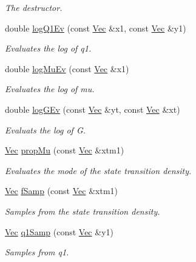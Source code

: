 \begin{DoxyCompactItemize}
\begin{DoxyCompactList}\small\item\em The destructor. \end{DoxyCompactList}\item 
double \hyperlink{classNAr1APFFilter_a0839d99fe62312b8a2c5c781b879fa79}{log\+Q1\+Ev} (const \hyperlink{pmfs_8h_a4c7df05c6f5e8a0d15ae14bcdbc07152}{Vec} \&x1, const \hyperlink{pmfs_8h_a4c7df05c6f5e8a0d15ae14bcdbc07152}{Vec} \&y1)
\begin{DoxyCompactList}\small\item\em Evaluates the log of q1. \end{DoxyCompactList}\item 
double \hyperlink{classNAr1APFFilter_ad85b9a81c93f86ebcc8e837bb2ca010f}{log\+Mu\+Ev} (const \hyperlink{pmfs_8h_a4c7df05c6f5e8a0d15ae14bcdbc07152}{Vec} \&x1)
\begin{DoxyCompactList}\small\item\em Evaluates the log of mu. \end{DoxyCompactList}\item 
double \hyperlink{classNAr1APFFilter_afabcd7acb729a62955856c9737e76059}{log\+G\+Ev} (const \hyperlink{pmfs_8h_a4c7df05c6f5e8a0d15ae14bcdbc07152}{Vec} \&yt, const \hyperlink{pmfs_8h_a4c7df05c6f5e8a0d15ae14bcdbc07152}{Vec} \&xt)
\begin{DoxyCompactList}\small\item\em Evaluats the log of G. \end{DoxyCompactList}\item 
\hyperlink{pmfs_8h_a4c7df05c6f5e8a0d15ae14bcdbc07152}{Vec} \hyperlink{classNAr1APFFilter_a92a000138b5440613ab85c3811eb5525}{prop\+Mu} (const \hyperlink{pmfs_8h_a4c7df05c6f5e8a0d15ae14bcdbc07152}{Vec} \&xtm1)
\begin{DoxyCompactList}\small\item\em Evaluates the mode of the state transition density. \end{DoxyCompactList}\item 
\hyperlink{pmfs_8h_a4c7df05c6f5e8a0d15ae14bcdbc07152}{Vec} \hyperlink{classNAr1APFFilter_a7490ba7d06d2d82930afce64100cce99}{f\+Samp} (const \hyperlink{pmfs_8h_a4c7df05c6f5e8a0d15ae14bcdbc07152}{Vec} \&xtm1)
\begin{DoxyCompactList}\small\item\em Samples from the state transition density. \end{DoxyCompactList}\item 
\hyperlink{pmfs_8h_a4c7df05c6f5e8a0d15ae14bcdbc07152}{Vec} \hyperlink{classNAr1APFFilter_a294a2044c95ba6e013758fa62f3ef979}{q1\+Samp} (const \hyperlink{pmfs_8h_a4c7df05c6f5e8a0d15ae14bcdbc07152}{Vec} \&y1)
\begin{DoxyCompactList}\small\item\em Samples from q1. \end{DoxyCompactList}\end{DoxyCompactItemize}



